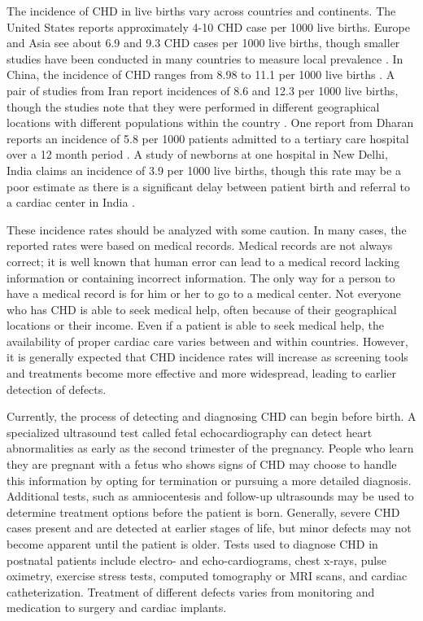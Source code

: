 The incidence of CHD in live births vary across countries and continents. The United States reports approximately 4-10 CHD case per 1000 live births. Europe and Asia see about 6.9 and 9.3 CHD cases per 1000 live births, though smaller studies have been conducted in many countries to measure local prevalence \cite{Mozaffarian2016}. In China, the incidence of CHD ranges from 8.98 to 11.1 per 1000 live births \cite{Zhao2019} \cite{Qu2016}. 
A pair of studies from Iran report incidences of 8.6 and 12.3 per 1000 live births, though the studies note that they were performed in different geographical locations with different populations within the country \cite{Nikyar2011} \cite{Rahim2008}.
One report from Dharan reports an incidence of 5.8 per 1000 patients admitted to a tertiary care hospital over a 12 month period \cite{Shah2008}. A study of newborns at one hospital in New Delhi, India claims an incidence of 3.9 per 1000 live births, though this rate may be a poor estimate as there is a significant delay between patient birth and referral to a cardiac center in India \cite{Khalil1994} \cite{Saxena2005}.

These incidence rates should be analyzed with some caution. In many cases, the reported rates were based on medical records. Medical records are not always correct; it is well known that human error can lead to a medical record lacking information or containing incorrect information. The only way for a person to have a medical record is for him or her to go to a medical center. Not everyone who has CHD is able to seek medical help, often because of their geographical locations or their income. Even if a patient is able to seek medical help, the availability of proper cardiac care varies between and within countries. However, it is generally expected that CHD incidence rates will increase as screening tools and treatments become more effective and more widespread, leading to earlier detection of defects.
 
Currently, the process of detecting and diagnosing CHD can begin before birth. A specialized ultrasound test called fetal echocardiography can detect heart abnormalities as early as the second trimester of the pregnancy. People who learn they are pregnant with a fetus who shows signs of CHD may choose to handle this information by opting for termination or pursuing a more detailed diagnosis. Additional tests, such as amniocentesis and follow-up ultrasounds may be used to determine treatment options before the patient is born. Generally, severe CHD cases present and are detected at earlier stages of life, but minor defects may not become apparent until the patient is older. Tests used to diagnose CHD in postnatal patients include electro- and echo-cardiograms, chest x-rays, pulse oximetry, exercise stress tests, computed tomography or MRI scans, and cardiac catheterization. Treatment of different defects varies from monitoring and medication to surgery and cardiac implants.

